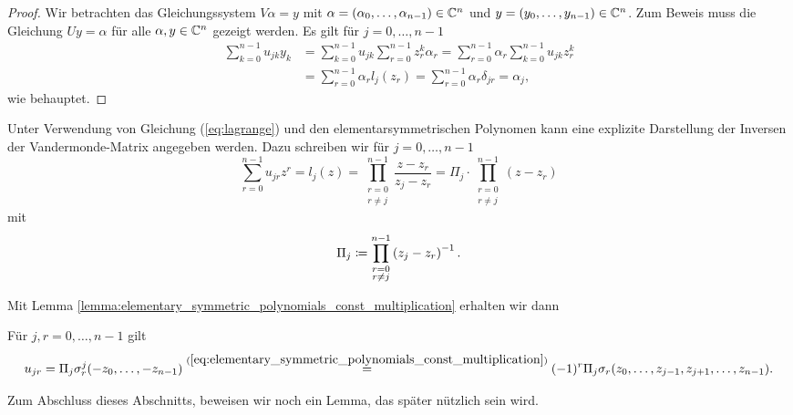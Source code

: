 \begin{proof}
    Wir betrachten das Gleichungssystem $V \alpha = y$ mit
    $\alpha = (\alpha_0, \dots, \alpha_{n-1}) \in \mathbb{C}^n$
    und $y = (y_0, \dots, y_{n-1}) \in \mathbb{C}^n$.
    Zum Beweis muss die Gleichung $U y = \alpha$ für alle $\alpha,  y \in \mathbb{C}^n$
    gezeigt werden.
    Es gilt für $j = 0, \dots, n-1$
    \[
        \begin{split}
            \sum_{k=0}^{n-1} u_{jk} y_k &= \sum_{k=0}^{n-1} u_{jk} \sum_{r=0}^{n-1} z_r^k \alpha_r = \sum_{r=0}^{n-1} \alpha_r \sum_{k=0}^{n-1} u_{jk} z_r^k\\
                                        &= \sum_{r=0}^{n-1} \alpha_r l_j(z_r) = \sum_{r=0}^{n-1} \alpha_r \delta_{jr} = \alpha_j,
        \end{split}
    \]
    wie behauptet.
\end{proof}

Unter Verwendung von Gleichung (\ref{eq:lagrange}) und den
elementarsymmetrischen Polynomen kann eine explizite Darstellung der
Inversen der Vandermonde-Matrix angegeben werden.
Dazu schreiben wir für $j = 0, \dots, n-1$
\begin{equation*}
    \sum_{r = 0}^{n-1} u_{jr} z^{r}
    = l_j(z)
    = \prod_{\substack{r=0\\ r \neq j}}^{n-1} \frac{z - z_r}{z_j - z_r}
    = \Pi_j \cdot \prod_{\substack{r=0\\ r \neq j}}^{n-1} \left( z - z_r \right)
\end{equation*}
mit
\begin{equation}
    \label{def:pi_j}
    \Pi_j \coloneqq \prod_{\substack{r=0\\ r \neq j}}^{n-1} \left( z_j - z_r \right)^{-1}.
\end{equation}

\noindent Mit Lemma
\ref{lemma:elementary_symmetric_polynomials_const_multiplication} erhalten
wir dann
\begin{lemma}
    Für $j, r = 0, \dots, n-1$ gilt
    \begin{equation}
        \label{eq:explicit_inverse_vandermonde}
        u_{jr}
        = \Pi_j \sigma_{r}^{j}(-z_0, \dots, -z_{n-1})
        \overset{(\ref{eq:elementary_symmetric_polynomials_const_multiplication})}{=}
          (-1)^r \Pi_j \sigma_{r}(z_0, \dots, z_{j-1}, z_{j+1}, \dots, z_{n-1}).
    \end{equation}
\end{lemma}

\noindent Zum Abschluss dieses Abschnitts, beweisen wir noch ein Lemma, das später
nützlich sein wird.

